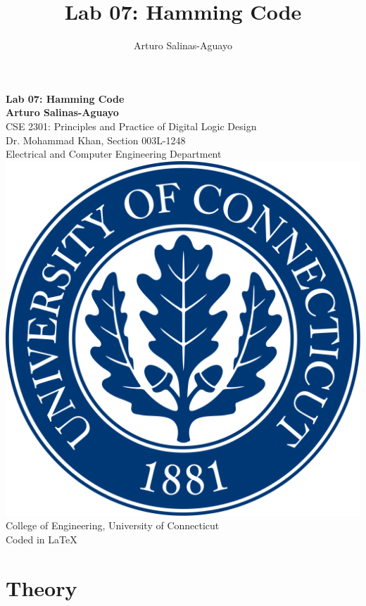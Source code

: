 \documentclass[12pt]{article}
\author{Arturo Salinas-Aguayo}
\title{Lab 07: Hamming Code}
\begin{document}
\newcommand{\closure}[2][3]{%
	{}\mkern#1mu\overline{\mkern-#1mu#2}}
\newcommand\ncoverline[1]{\mkern1mu\overline{\mkern-1mu#1\mkern-1mu}\mkern1mu}
\begin{titlepage}
	\centering
	\vspace*{3cm}
	\huge\textbf{Lab 07: Hamming Code}\\
	\vspace{5cm}
	\Large\textbf{Arturo Salinas-Aguayo}\\
	\normalsize
	CSE 2301: Principles and Practice of Digital Logic Design\\
	Dr. Mohammad Khan, Section 003L-1248\\
	Electrical and Computer Engineering Department
	\vfill
	\includegraphics[scale=0.1]{uconnlogo}\\
	College of Engineering, University of Connecticut\\
	\scriptsize{Coded in \LaTeX}
	\vspace*{1cm}
\end{titlepage}
\section*{Theory}
\end{document}
